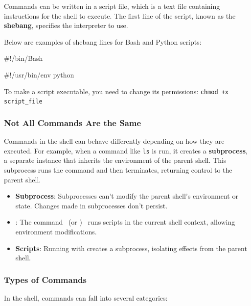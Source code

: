Commands can be written in a script file, which is a text file containing instructions for the shell to execute. 
The first line of the script, known as the \textbf{shebang}, specifies the interpreter to use.

Below are examples of shebang lines for Bash and Python scripts:

\begin{codeblock}[language=bash, numbers=none]
#!/bin/Bash

#!/usr/bin/env python
\end{codeblock}

To make a script executable, you need to change its permissions:
\texttt{chmod +x script\_file}

\subsubsection{Not All Commands Are the Same}

Commands in the shell can behave differently depending on how they are executed. For example, when a command like \texttt{ls} is run, it creates a \textbf{subprocess}, a separate instance that inherits the environment of the parent shell. This subprocess runs the command and then terminates, returning control to the parent shell.

\begin{tipsblock}
    \begin{itemize}
        \item \textbf{Subprocess}: Subprocesses can't modify the parent shell's environment or state. Changes made in subprocesses don't persist.
        \item \textbf{}: The  command \ (or ) \ runs scripts in the current shell context, allowing environment modifications.
        \item \textbf{Scripts}: Running with  creates a subprocess, isolating effects from the parent shell.
    \end{itemize}
\end{tipsblock}

\subsubsection{Types of Commands}

In the shell, commands can fall into several categories:

